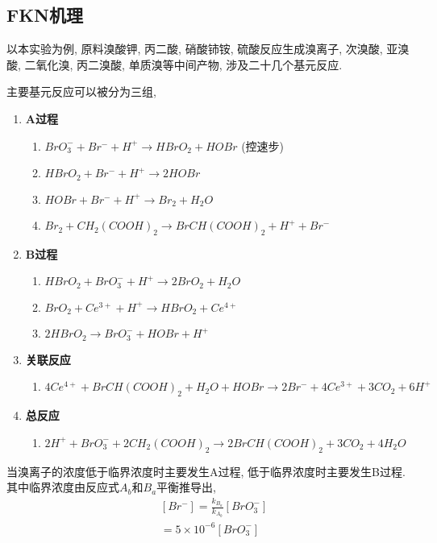 \documentclass[a4paper]{article}
\begin{document}
\subsection{FKN机理}
以本实验为例, 原料溴酸钾, 丙二酸, 硝酸铈铵, 硫酸反应生成溴离子,
次溴酸, 亚溴酸, 二氧化溴, 丙二溴酸, 单质溴等中间产物, 
涉及二十几个基元反应.\par
主要基元反应可以被分为三组,
\begin{enumerate}
	\item \textbf{A过程}
	\begin{enumerate}
		\item $BrO_{3}^{-} + Br^{-} + H^{+} \to HBrO_{2} + HOBr$ (控速步)
		\item $HBrO_{2} + Br^{-} + H^{+} \to 2HOBr$
		\item $HOBr + Br^{-} + H^{+} \to Br_{2} + H_{2}O$
		\item $Br_{2} + CH_{2}(COOH)_{2} 
				\to BrCH(COOH)_{2} + H^{+} + Br^{-}$
	\end{enumerate}
	\item \textbf{B过程}
	\begin{enumerate}
		\item $HBrO_{2} + BrO_{3}^{-} + H^{+}
				\to 2BrO_{2} + H_{2}O$
		\item $BrO_{2} + Ce^{3+} + H^{+}
				\to HBrO_{2} + Ce^{4+}$
		\item $2HBrO_{2}
				\to BrO_{3}^{-} + HOBr + H^{+}$
	\end{enumerate}
	\item \textbf{关联反应}
	\begin{enumerate}
		\item $4Ce^{4+} + BrCH(COOH)_{2} + H_{2}O + HOBr 
				\to 2Br^{-} + 4Ce^{3+} + 3CO_{2} + 6H^{+}$
	\end{enumerate}
	\item \textbf{总反应}
	\begin{enumerate}
		\item $2H^{+} + BrO_{3}^{-} + 2CH_{2}(COOH)_{2} 
				\to 2BrCH(COOH)_{2} + 3CO_{2} + 4H_{2}O$
	\end{enumerate}
\end{enumerate}
\par
当溴离子的浓度低于临界浓度时主要发生A过程, 
低于临界浓度时主要发生B过程. 其中临界浓度由反应式$A_{b}$和$B_{a}$平衡推导出, \\

\begin{equation}
	\begin{aligned}
			&[Br^{-}] = \frac{k_{B_a}}{k_{A_b}}[BrO_{3}^{-}]\\
					&= 5\times 10^{-6} [BrO_{3}^{-}]\\
	\end{aligned}
\end{equation}
\end{document}
